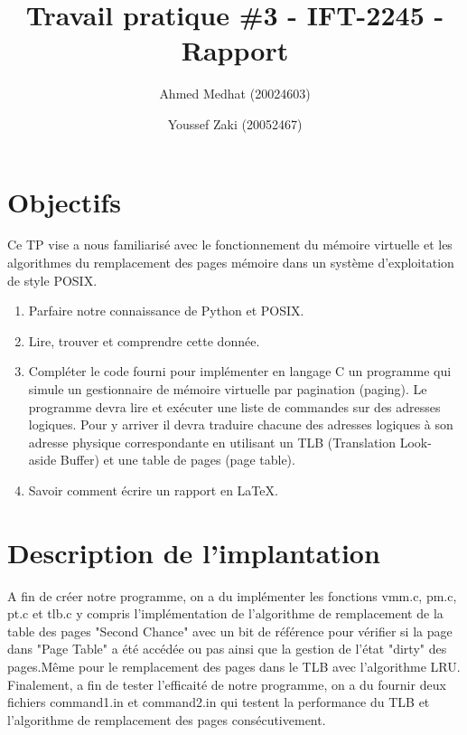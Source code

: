 \documentclass{article}
\title{Travail pratique \#3 - IFT-2245 - Rapport}
\author{Ahmed Medhat (20024603) \and Youssef Zaki (20052467)}
\begin{document}
\maketitle

\section{Objectifs}

Ce TP vise a nous familiarisé avec le fonctionnement du mémoire virtuelle et les algorithmes du remplacement des pages mémoire dans un système d'exploitation de style POSIX.\\
\begin{enumerate}
\item Parfaire notre connaissance de Python et POSIX.
\item Lire, trouver et comprendre cette donnée.
\item Compléter le code fourni pour implémenter en langage C un programme
qui simule un gestionnaire de mémoire virtuelle par pagination (paging). 
Le programme devra lire et exécuter une liste de commandes sur des
adresses logiques. Pour y arriver il devra traduire chacune des adresses logiques
à son adresse physique correspondante en utilisant un TLB (Translation Look-
aside Buffer) et une table de pages (page table).
\item Savoir comment écrire un rapport en LaTeX.
\end{enumerate}


\section{Description de l'implantation}
A fin de créer notre programme, on a du implémenter les fonctions vmm.c, pm.c, pt.c et tlb.c y compris l'implémentation de l'algorithme de remplacement de la table des pages "Second Chance" avec un bit de référence pour vérifier si la page dans "Page Table" a été accédée ou pas ainsi que la gestion de l'état "dirty" des pages.Même pour le remplacement des pages dans le TLB avec l'algorithme LRU.\\
Finalement, a fin de tester l'efficaité de notre programme, on a du fournir deux fichiers command1.in et command2.in qui testent la performance du TLB et l'algorithme de remplacement des pages consécutivement.
\end{document}
